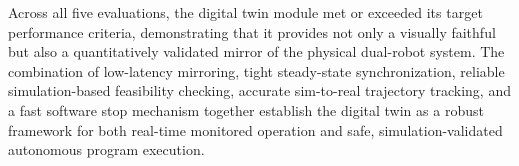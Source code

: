 

Across all five evaluations, the digital twin module met or exceeded its target performance criteria, demonstrating that it provides not only a visually faithful but also a quantitatively validated mirror of the physical dual-robot system. The combination of low-latency mirroring, tight steady-state synchronization, reliable simulation-based feasibility checking, accurate sim-to-real trajectory tracking, and a fast software stop mechanism together establish the digital twin as a robust framework for both real-time monitored operation and safe, simulation-validated autonomous program execution.